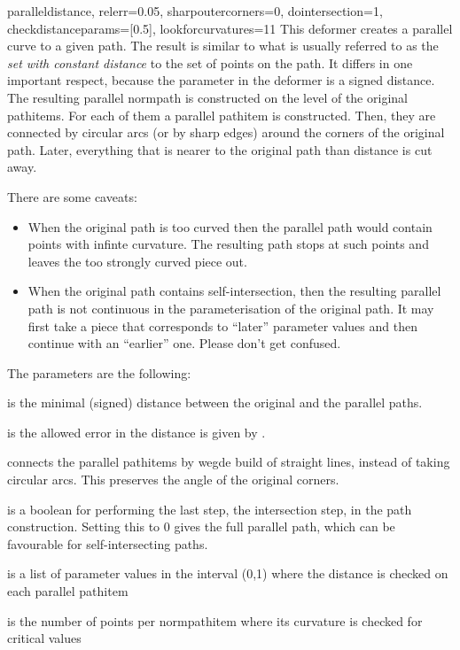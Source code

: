 \begin{classdesc}{parallel}{distance, relerr=0.05, sharpoutercorners=0, dointersection=1,
                       checkdistanceparams=[0.5], lookforcurvatures=11}%
This deformer creates a parallel curve to a given path. The result is similar to
what is usually referred to as the \emph{set with constant distance} to the set of
points on the path. It differs in one important respect, because the
 parameter in the deformer is a signed distance. The resulting
parallel normpath is constructed on the level of the original pathitems. For
each of them a parallel pathitem is constructed. Then, they are connected by
circular arcs (or by sharp edges) around the corners of the original path.
Later, everything that is nearer to the original path than distance is cut away.

There are some caveats:
\begin{itemize}
  \item When the original path is too curved then the parallel path would
  contain points with infinte curvature. The resulting path stops at such points
  and leaves the too strongly curved piece out.
  \item When the original path contains self-intersection, then the resulting
  parallel path is not continuous in the parameterisation of the original path.
  It may first take a piece that corresponds to ``later'' parameter values and
  then continue with an ``earlier'' one. Please don't get confused.
\end{itemize}

The parameters are the following:

 is the minimal (signed) distance between the original and the
parallel paths.

 is the allowed error in the distance is given by
.

 connects the parallel pathitems by wegde build of
straight lines, instead of taking circular arcs. This preserves the angle of the
original corners.

 is a boolean for performing the last step, the intersection
step, in the path construction. Setting this to 0 gives the full parallel path,
which can be favourable for self-intersecting paths.

 is a list of parameter values in the interval (0,1)
where the distance is checked on each parallel pathitem

 is the number of points per normpathitem where its
curvature is checked for critical values

\end{classdesc}

